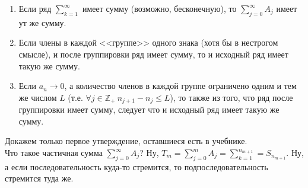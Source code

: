 \documentclass{article}
\begin{document}
\begin{itemize}
        \thm
        \begin{enumerate}
            \item Если ряд $\sum\limits_{k=1}^\infty$ имеет сумму (возможно, бесконечную), то $\sum\limits_{j=0}^\infty A_j$ имеет ут же сумму.
            \item Если члены в каждой <<группе>> одного знака (хотя бы в нестрогом смысле), и после группировки ряд имеет сумму, то и исходный ряд имеет такую же сумму.
            \item Если $a_n\rightarrow 0$, а количество членов в каждой группе ограничено одним и тем же числом $L$ (т.е. $\forall j\in\mathbb Z_+~n_{j+1}-n_j\leqslant L$), то также из того, что ряд после группировки имеет сумму, следует что и исходный ряд имеет такую же сумму.
        \end{enumerate}
        \begin{Proof}
            Докажем только первое утверждение, оставшиеся есть в учебнике.\\
            Что такое частичная сумма $\sum\limits_{j=0}^\infty A_j$? Ну, $T_m=\sum\limits_{j=0}^m A_j=\sum\limits_{k=1}^{n_{m+1}}=S_{n_{m+1}}$. Ну, а если последовательность куда-то стремится, то подпоследовательность стремится туда же.
        \end{Proof}
    \end{itemize}
\end{document}
